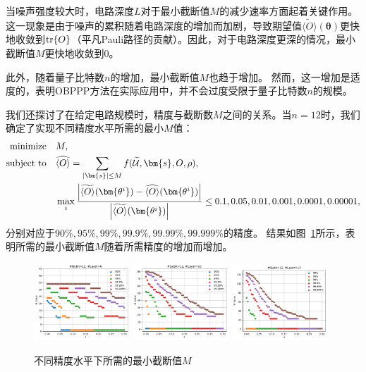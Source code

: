 当噪声强度较大时，电路深度$L$对于最小截断值$M$的减少速率方面起着关键作用。
这一现象是由于噪声的累积随着电路深度的增加而加剧，导致期望值$\widetilde{\langle O \rangle}(\bm{\theta})$更快地收敛到$\tr{O}$（平凡Pauli路径的贡献）。因此，对于电路深度更深的情况，最小截断值$M$更快地收敛到$0$。

此外，随着量子比特数$n$的增加，最小截断值$M$也趋于增加。
然而，这一增加是适度的，表明OBPPP方法在实际应用中，并不会过度受限于量子比特数$n$的规模。

我们还探讨了在给定电路规模时，精度与截断数$M$之间的关系。当$n = 12$时，我们确定了实现不同精度水平所需的最小$M$值：
\begin{equation}
    \begin{aligned}
        \text{minimize} \quad & M,\\
        \text{subject to} \quad & \widehat{\langle O \rangle}=\sum_{\abs{\bm{s}}\leq M}f(\widetilde{\mathcal{U}},\bm{s},O,\rho),\\
        &\max_{i}\frac{\abs{\widetilde{\langle O \rangle}(\bm{\theta^i})-\widehat{\langle O \rangle}(\bm{\theta^i})}}{\abs{\widetilde{\langle O \rangle}(\bm{\theta^i})}}\leq 0.1,0.05,0.01,0.001,0.0001,0.00001,
    \end{aligned}
\end{equation}
分别对应于$90\%,95\%,99\%,99.9\%,99.99\%,99.999\%$的精度。
结果如图~\ref{fig:numerical_ACC}所示，表明所需的最小截断值$M$随着所需精度的增加而增加。


\begin{figure}[htbp]
    \centering
    \includegraphics[width=0.32\textwidth]{figures/complexity2/ACC1}
    \includegraphics[width=0.32\textwidth]{figures/complexity2/ACC2}
    \includegraphics[width=0.32\textwidth]{figures/complexity2/ACC3}
    \caption{
        不同精度水平下所需的最小截断值$M$}\label{fig:numerical_ACC}
\end{figure}

